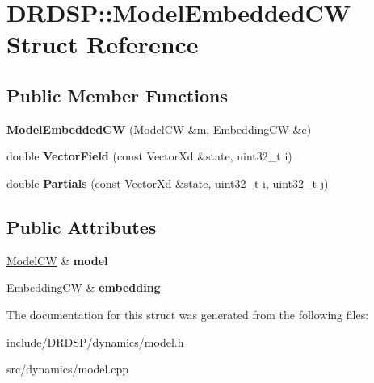 \hypertarget{struct_d_r_d_s_p_1_1_model_embedded_c_w}{\section{D\-R\-D\-S\-P\-:\-:Model\-Embedded\-C\-W Struct Reference}
\label{struct_d_r_d_s_p_1_1_model_embedded_c_w}
}
\subsection*{Public Member Functions}
\begin{DoxyCompactItemize}
\item 
\hypertarget{struct_d_r_d_s_p_1_1_model_embedded_c_w_aa4d612f6d5c9060c38c99008b04b10dd}{{\bfseries Model\-Embedded\-C\-W} (\hyperlink{struct_d_r_d_s_p_1_1_model_c_w}{Model\-C\-W} \&m, \hyperlink{struct_d_r_d_s_p_1_1_embedding_c_w}{Embedding\-C\-W} \&e)}\label{struct_d_r_d_s_p_1_1_model_embedded_c_w_aa4d612f6d5c9060c38c99008b04b10dd}

\item 
\hypertarget{struct_d_r_d_s_p_1_1_model_embedded_c_w_a0d7f5f41f6211498d63de4e882b12dea}{double {\bfseries Vector\-Field} (const Vector\-Xd \&state, uint32\-\_\-t i)}\label{struct_d_r_d_s_p_1_1_model_embedded_c_w_a0d7f5f41f6211498d63de4e882b12dea}

\item 
\hypertarget{struct_d_r_d_s_p_1_1_model_embedded_c_w_a6d82aae83ad411ddf8459aeeebc93d14}{double {\bfseries Partials} (const Vector\-Xd \&state, uint32\-\_\-t i, uint32\-\_\-t j)}\label{struct_d_r_d_s_p_1_1_model_embedded_c_w_a6d82aae83ad411ddf8459aeeebc93d14}

\end{DoxyCompactItemize}
\subsection*{Public Attributes}
\begin{DoxyCompactItemize}
\item 
\hypertarget{struct_d_r_d_s_p_1_1_model_embedded_c_w_a8f582175d25ab090a16ac5ca44c3424e}{\hyperlink{struct_d_r_d_s_p_1_1_model_c_w}{Model\-C\-W} \& {\bfseries model}}\label{struct_d_r_d_s_p_1_1_model_embedded_c_w_a8f582175d25ab090a16ac5ca44c3424e}

\item 
\hypertarget{struct_d_r_d_s_p_1_1_model_embedded_c_w_abd957dbddb85f3625f5029604a88b5a8}{\hyperlink{struct_d_r_d_s_p_1_1_embedding_c_w}{Embedding\-C\-W} \& {\bfseries embedding}}\label{struct_d_r_d_s_p_1_1_model_embedded_c_w_abd957dbddb85f3625f5029604a88b5a8}

\end{DoxyCompactItemize}


The documentation for this struct was generated from the following files\-:\begin{DoxyCompactItemize}
\item 
include/\-D\-R\-D\-S\-P/dynamics/model.\-h\item 
src/dynamics/model.\-cpp\end{DoxyCompactItemize}
